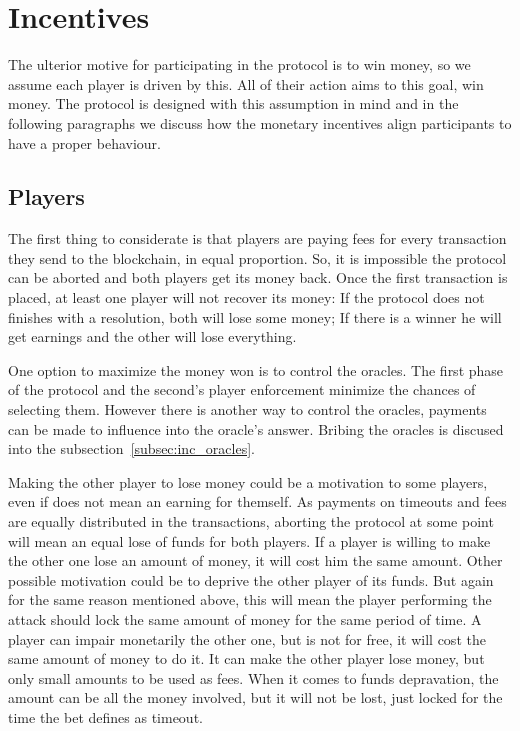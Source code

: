 \section{Incentives}

The ulterior motive for participating in the protocol is to win money, so we
  assume each player is driven by this.
All of their action aims to this goal, win money. The protocol is designed with
  this assumption in mind and in the following paragraphs we discuss how the
  monetary incentives align participants to have a proper behaviour.

\subsection{Players}
The first thing to considerate is that players are paying fees for every
  transaction they send to the blockchain, in equal proportion.
So, it is impossible the protocol can be aborted and both players get its
  money back.
Once the first transaction is placed, at least one player will not recover its
  money: If the protocol does not finishes with a resolution, both will lose
  some money; If there is a winner he will get earnings and the other will lose
  everything.

One option to maximize the money won is to control the oracles.
The first phase of the protocol and the second's player enforcement
  minimize the chances of selecting them.
However there is another way to control the oracles, payments can be made to
  influence into the oracle's answer.
Bribing the oracles is discused into the subsection~\ref{subsec:inc_oracles}.

Making the other player to lose money could be a motivation to some players,
  even if does not mean an earning for themself.
As payments on timeouts and fees are equally distributed in the transactions,
  aborting the protocol at some point will mean an equal lose of funds for both
  players. If a player is willing to make the other one lose an amount of money,
  it will cost him the same amount.
Other possible motivation could be to deprive the other player of its funds.
But again for the same reason mentioned above, this will mean the player
  performing the attack should lock the same amount of money for the same period
  of time.
A player can impair monetarily the other one, but is not for free, it will cost
  the same amount of money to do it. It can make the other player lose money,
  but only small amounts to be used as fees.
When it comes to funds depravation, the amount can be all the money involved,
  but it will not be lost, just locked for the time the bet defines as timeout.

